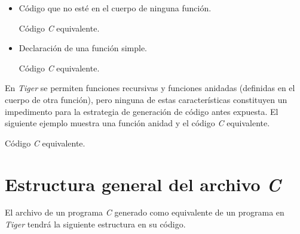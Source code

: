 \documentclass{article}
\begin{document}
\begin{itemize}

    \item Código que no esté en el cuerpo de ninguna función.
    
    \begin{quote}
    
    \end{quote}

    Código \textit{C} equivalente.

    \begin{quote}
    
    \end{quote}

    \item Declaración de una función simple.
    
    \begin{quote}
    
    \end{quote}

    Código \textit{C} equivalente.

    \begin{quote}
    
    \end{quote} 

\end{itemize}

En \textit{Tiger} se permiten funciones recursivas y funciones anidadas
(definidas en el cuerpo de otra función), pero ninguna de estas características
constituyen un impedimento para la estrategia de generación de código antes
expuesta. El siguiente ejemplo muestra una función anidad y el código
\textit{C} equivalente. 

    \begin{quote}
    
    \end{quote}

    Código \textit{C} equivalente.

    \begin{quote}
    
    \end{quote}

\section{Estructura general del archivo \emph{C}}

El archivo de un programa \textit{C} generado como equivalente de un programa en
\textit{Tiger} tendrá la siguiente estructura en su código.
\end{document}
